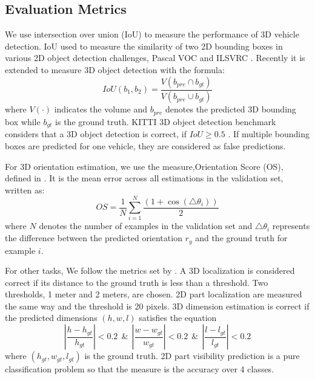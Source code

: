\subsection{Evaluation Metrics}

We use intersection over union (IoU) to measure the performance of 3D vehicle detection. IoU used to measure the similarity of two 2D bounding boxes in various 2D object detection challenges, \eg Pascal VOC \cite{Everingham15} and ILSVRC \cite{DBLP:Russakovsky14}. Recently it is extended to measure 3D object detection with the formula:
\begin{equation}
	IoU(b_1, b_2) = \frac{V(b_{pre}\cap b_{gt})}{V(b_{pre}\cup b_{gt})}
\end{equation}
where $V(\cdot)$ indicates the volume and $b_{pre}$ denotes the predicted 3D bounding box while $b_{gt}$ is the ground truth. KITTI 3D object detection benchmark considers that a 3D object detection is correct, if $IoU \geq 0.5$ \cite{Geiger2012CVPR}. If multiple bounding boxes are predicted for one vehicle, they are considered as false predictions. %

For 3D orientation estimation, we use the measure,Orientation Score (OS), defined in \cite{DBLP:journals/corr/MousavianAFK16}. It is the mean error across all estimations in the validation set, written as:
\begin{equation}
	OS =\frac{1}{N} \sum_{i=1}^N\frac{(1+\cos(\triangle \theta_i))}{2}
\end{equation}
where $N$ denotes the number of examples in the validation set and $\triangle \theta_i$ represents the difference between the predicted orientation $r_y$ and the ground truth for example $i$.

 For other tasks, We follow the metrics set by \cite{DBLP:journals/corr/ChabotCRTC17}. A 3D localization is considered correct if its distance to the ground truth is less than a threshold. Two thresholds, 1 meter and 2 meters, are chosen. 2D part localization are measured the same way and the threshold is 20 pixels. 3D dimension estimation is correct if the predicted dimensions $(h, w, l)$ satisfies the equation
\begin{equation}
	\left | \frac{h-h_{gt}}{h_{gt}} \right | < 0.2  ~~\&~~\left | \frac{w-w_{gt}}{w_{gt}} \right | < 0.2  ~~\&~~ \left | \frac{l-l_{gt}}{l_{gt}} \right | < 0.2
\end{equation}
where $(h_{gt}, w_{gt}, l_{gt})$ is the ground truth. 2D part visibility prediction is a pure classification problem so that the measure is the accuracy over 4 classes.

